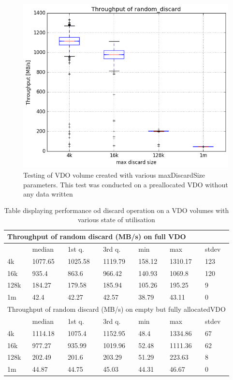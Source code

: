 \documentclass[
  color, %
  table, %
  lof,   %
  lot,   %
]{fithesis3}
\begin{document}
\begin{figure}[!htb]
        \includegraphics[width=\textwidth]{../results/discards/empty_VDO/report/random_discard1_compare_boxplots}
\caption[Discards]{Testing of VDO volume created with various maxDiscardSize parameters. This test was conducted on a preallocated VDO without any data written}
\label{fig:discard-empty}
\end{figure}

\begin{table}
\centering
\begin{tabular}{|l|l|l|l|l|l|l|}
        \hline
        \multicolumn{7}{|l|}{Throughput of random discard (MB/s) on full VDO} \\ \hline
         & median & 1st q. & 3rd q. & min & max & stdev \\ \hline 
4k & 1077.65 & 1025.58 & 1119.79 & 158.12 & 1310.17 & 123 \\ \hline
16k & 935.4 & 863.6 & 966.42 & 140.93 & 1069.8 & 120 \\ \hline
128k & 184.27 & 179.58 & 185.94 & 105.26 & 195.25 & 9 \\ \hline
1m & 42.4 & 42.27 & 42.57 & 38.79 & 43.11 & 0 \\ \hline
\hline
        \multicolumn{7}{|l|}{Throughput of random discard (MB/s) on empty but fully allocatedVDO} \\ \hline
        & median & 1st q. & 3rd q. & min & max & stdev \\ \hline 
4k & 1114.18 & 1075.4 & 1152.95 & 48.4 & 1334.86 & 67 \\ \hline
16k & 977.27 & 935.99 & 1019.96 & 52.48 & 1111.36 & 62 \\ \hline
128k & 202.49 & 201.6 & 203.29 & 51.29 & 223.63 & 8 \\ \hline
1m & 44.87 & 44.75 & 45.03 & 44.31 & 46.67 & 0 \\ \hline
\end{tabular}
\caption{Table displaying performance od discard operation on a VDO volumes with various state of utilisation}
\end{table}
\end{document}
